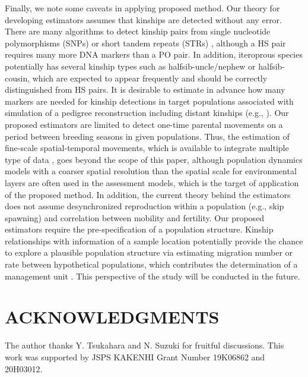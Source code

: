 \documentclass[12pt, English]{article}
\begin{document}
\begin{spacing}{1.9}
Finally, we note some caveats in applying proposed method. Our theory for developing estimators assumes that kinships are detected without any error. There are many algorithms to detect kinship pairs from single nucleotide polymorphisms (SNPs) or short tandem repeats (STRs) \cite[e.g., ][]{Wang_2009Genetics, Huisman_2017}, although a HS pair requires many more DNA markers than a PO pair. In addition, iteroprous species potentially has several kinship types such as halfsib-uncle/nephew or halfsib-cousin, which are expected to appear frequently and should be correctly distinguished from HS pairs. It is desirable to estimate in advance how many markers are needed for kinship detections in target populations associated with simulation of a pedigree reconstruction including distant kinships (e.g., \cite{Anderson_2020}). Our proposed estimators are limited to detect one-time parental movements on a period between breeding seasons in given populations. Thus, the estimation of fine-scale spatial-temporal movements, which is available to integrate multiple type of data \cite[]{Thorson_2021}, goes beyond the scope of this paper, although population dynamics models with a coarser spatial resolution than the spatial scale for environmental layers are often used in the assessment models, which is the target of application of the proposed method. In addition, the current theory behind the estimators does not assume desynchronized reproduction within a population (e.g., skip spawning) and correlation between mobility and fertility. Our proposed estimators require the pre-specification of a population structure. Kinship relationships with information of a sample location potentially provide the chance to explore a plausible population structure via estimating migration number or rate between hypothetical populations, which contributes the determination of a management unit \cite[]{Hastings_1993, Waples_2006_MolEcol, PALSBOLL200711}. This perspective of the study will be conducted in the future.


\section*{ACKNOWLEDGMENTS}
The author thanks Y. Tsukahara and N. Suzuki for fruitful discussions. This work was supported by JSPS KAKENHI Grant Number 19K06862 and 20H03012.


\end{spacing}
\end{document}
